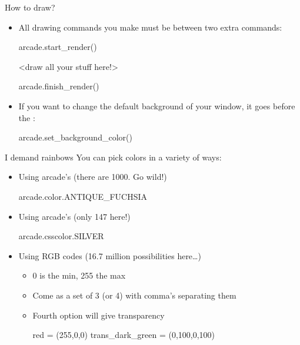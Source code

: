 \documentclass[pdf, aspectratio=169, 12pt]{beamer}
\begin{document}
\begin{frame}[fragile]{How to draw?}
	\begin{itemize}
		\item All drawing commands you make must be between two extra commands:
			\begin{pythoncode}
				arcade.start_render()

				<draw all your stuff here!>

				arcade.finish_render()
			\end{pythoncode}
		\item If you want to change the default background of your window, it goes before the :
			\begin{pythoncode}
				arcade.set_background_color()
			\end{pythoncode}
	\end{itemize}
\end{frame}

\begin{frame}[fragile]{I demand rainbows}
	\vspace{8mm}
	You can pick colors in a variety of ways:
	\begin{itemize}
		\item Using arcade's  (there are 1000. Go wild!)
			\begin{pythoncode}
				arcade.color.ANTIQUE_FUCHSIA
			\end{pythoncode}
		\item Using arcade's  (only 147 here!)
			\begin{pythoncode}
				arcade.csscolor.SILVER
			\end{pythoncode}
		\item Using RGB codes (16.7 million possibilities here\ldots)
			\begin{itemize}
				\item 0 is the min, 255 the max
				\item Come as a set of 3 (or 4) with comma's separating them
				\item Fourth option will give transparency
				\footnotesize
				\begin{pythoncode}
					red = (255,0,0)
					trans_dark_green = (0,100,0,100)
				\end{pythoncode}
			\end{itemize}
	\end{itemize}
\end{frame}
\end{document}
